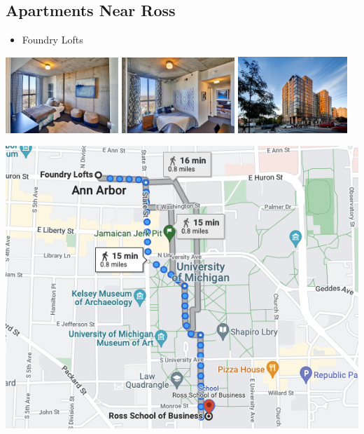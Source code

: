 \documentclass[
]{book}
\providecommand{\tightlist}{%
  \setlength{\itemsep}{0pt}\setlength{\parskip}{0pt}}
\begin{document}
\hypertarget{apartments-near-ross}{%
\subsection{Apartments Near Ross}\label{apartments-near-ross}}

\begin{itemize}
\tightlist
\item
  Foundry Lofts
\end{itemize}

\includegraphics[width=0.32\textwidth,height=\textheight]{Foundry_Lofts_inside_1.jpg}
\includegraphics[width=0.32\textwidth,height=\textheight]{Foundry_Lofts_inside_2.jpg}
\includegraphics[width=0.31\textwidth,height=\textheight]{Foundry_Lofts_outside_1.jpg}

\begin{center}\includegraphics{Foundry map} \end{center}
\end{document}
